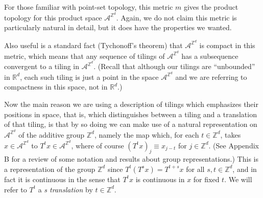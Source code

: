 \documentclass[reqno]{stml-l}
\theoremstyle{plain}
\theoremstyle{definition}
\numberwithin{equation}{chapter}
\begin{document}
For those familiar with point-set topology, this metric $m$ gives the product topology for this product space $\mathcal{A}^{\mathbb{Z}^{d}}$. Again, we do not claim this metric is particularly natural in detail, but it does have the properties we wanted.

Also useful is a standard fact (Tychonoff's theorem) that $\mathcal{A}^{\mathbb{Z}^{d}}$ is compact in this metric, which means that any sequence of tilings of $\mathcal{A}^{\mathbb{Z}^{d}}$ has a subsequence convergent to a tiling in $\mathcal{A}^{\mathbb{Z}^{d}}$.  (Recall that although our tilings are ``unbounded'' in $\mathbb{R}^{d}$, each such tiling is just
a point in the space $\mathcal{A}^{\mathbb{Z}^{d}}$ and we are referring to compactness in this space, not in $\mathbb{R}^{d}$.)

Now the main reason we are using a description of tilings which emphasizes their positions in space, that is, which distinguishes between a tiling and a translation of that tiling, is that by so doing we can make use of a natural representation on $\mathcal{A}^{\mathbb{Z}^{d}}$ of the additive group $\mathbb{Z}^{d}$, namely the map which, for each $t\in \mathbb{Z}^{d}$, takes $x\in \mathcal{A}^{\mathbb{Z}^{d}}$ to $T^{t}x\in \mathcal{A}^{\mathbb{Z}^{d}}$, where of course $(T^{t}x)_{j}\equiv x_{j-t}$ for $j\in \mathbb{Z}^{d}$. (See Appendix B for a review of some notation and results about group representations.) This is a representation of the group $\mathbb{Z}^{d}$ since $T^{t}(T^{s}x)=T^{t+s}x$ for all $s,t\in \mathbb{Z}^{d}$, and in fact it is continuous in the sense that $T^{t}x$ is continuous in $x$ for fixed $t$. We will refer to $T^{t}$ a \emph{s translation} by $t\in \mathbb{Z}^{d}$.
\end{document}
